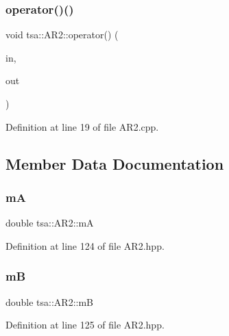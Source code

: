 \subsubsection{\texorpdfstring{operator()()}{operator()()}}
{\footnotesize\ttfamily void tsa\+::\+A\+R2\+::operator() (\begin{DoxyParamCaption}\item[{\hyperlink{namespacetsa_ac599574bcc094eda25613724b8f3ca9e}{Seq\+View\+Double} \&}]{in,  }\item[{\hyperlink{namespacetsa_ac599574bcc094eda25613724b8f3ca9e}{Seq\+View\+Double} \&}]{out }\end{DoxyParamCaption})}



Definition at line 19 of file A\+R2.\+cpp.



\subsection{Member Data Documentation}
\mbox{\label{classtsa_1_1_a_r2_ad91c696d1eb47fb92e4440de0e871b34}} 
\subsubsection{\texorpdfstring{mA}{mA}}
{\footnotesize\ttfamily double tsa\+::\+A\+R2\+::mA\hspace{0.3cm}{\ttfamily [private]}}



Definition at line 124 of file A\+R2.\+hpp.

\mbox{\label{classtsa_1_1_a_r2_aa5edb94b32659768807f67f124b055f7}} 
\subsubsection{\texorpdfstring{mB}{mB}}
{\footnotesize\ttfamily double tsa\+::\+A\+R2\+::mB\hspace{0.3cm}{\ttfamily [private]}}



Definition at line 125 of file A\+R2.\+hpp.

\mbox{\label{classtsa_1_1_a_r2_a1e28277853e0e35cca6eb9a283cbc39e}} 
